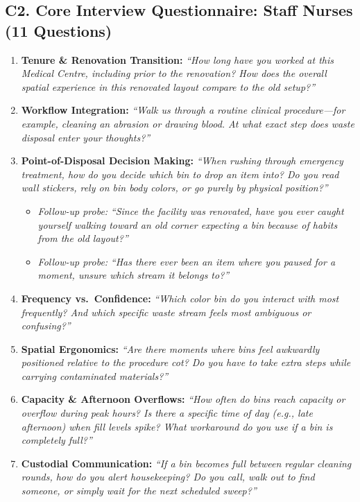 \documentclass[11pt,a4paper]{article}
\begin{document}
\subsection{C2. Core Interview Questionnaire: Staff Nurses (11 Questions)}
\begin{enumerate}[leftmargin=*, itemsep=3pt]
    \item \textbf{Tenure \& Renovation Transition:} \emph{``How long have you worked at this Medical Centre, including prior to the renovation? How does the overall spatial experience in this renovated layout compare to the old setup?''}
    \item \textbf{Workflow Integration:} \emph{``Walk us through a routine clinical procedure---for example, cleaning an abrasion or drawing blood. At what exact step does waste disposal enter your thoughts?''}
    \item \textbf{Point-of-Disposal Decision Making:} \emph{``When rushing through emergency treatment, how do you decide which bin to drop an item into? Do you read wall stickers, rely on bin body colors, or go purely by physical position?''}
        \begin{itemize}[nosep]
            \item \emph{Follow-up probe:} \emph{``Since the facility was renovated, have you ever caught yourself walking toward an old corner expecting a bin because of habits from the old layout?''}
            \item \emph{Follow-up probe:} \emph{``Has there ever been an item where you paused for a moment, unsure which stream it belongs to?''}
        \end{itemize}
    \item \textbf{Frequency vs.\ Confidence:} \emph{``Which color bin do you interact with most frequently? And which specific waste stream feels most ambiguous or confusing?''}
    \item \textbf{Spatial Ergonomics:} \emph{``Are there moments where bins feel awkwardly positioned relative to the procedure cot? Do you have to take extra steps while carrying contaminated materials?''}
    \item \textbf{Capacity \& Afternoon Overflows:} \emph{``How often do bins reach capacity or overflow during peak hours? Is there a specific time of day (e.g., late afternoon) when fill levels spike? What workaround do you use if a bin is completely full?''}
    \item \textbf{Custodial Communication:} \emph{``If a bin becomes full between regular cleaning rounds, how do you alert housekeeping? Do you call, walk out to find someone, or simply wait for the next scheduled sweep?''}

\end{enumerate}
\end{document}
